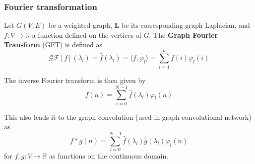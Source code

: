 \subsubsection{Fourier transformation}

Let $G(V,E)$ be a weighted graph, $\mathbf{L}$ be its corresponding graph Laplacian, and $f: V\to \mathbb{R}$ a function defined on the vertices of $G$. The \textbf{Graph Fourier Transform} (GFT) is defined as
\begin{equation}
  \mathcal{GF}[f](\lambda_{l}) = \hat{f}(\lambda_{l}) = \langle f, \varphi_{l} \rangle = \sum_{i=1}^{n} f(i) \varphi_{l}(i)
\end{equation}

The inverse Fourier transform is then given by \begin{equation}
  f(n) = \sum_{i=0}^{N-1} \hat{f}(\lambda_{l})\varphi_{l}(n) 
\end{equation}

This also leads it to the graph convolution (used in graph convolutional network) as
\begin{equation}
  f * g(n) = \sum_{l=0}^{N-1} \hat{f}(\lambda_{l})\hat{g}(\lambda_l)\varphi_{l}(n)
\end{equation}
for $f,g: V\to \mathbb{R}$ as functions on the continuous domain. 
